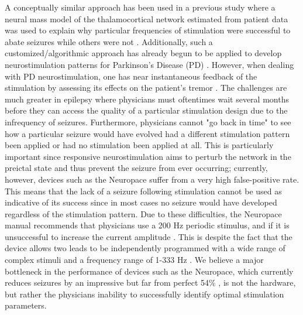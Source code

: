 \documentclass[11pt,a4paper,final]{article}
\begin{document}
A conceptually similar approach has been used in a previous study where a neural mass model of the thalamocortical network estimated from patient data was used to explain why particular frequencies of stimulation were successful to abate seizures while others were not \citep{wendling13}.
Additionally, such a customized/algorithmic approach has already begun to be applied to develop neurostimulation patterns for Parkinson's Disease (PD) \citep{holt14,grill14patent,brocker17,pena17}.
However, when dealing with PD neurostimulation, one has near instantaneous feedback of the stimulation by assessing its effects on the patient's tremor \citep{grill13}.
The challenges are much greater in epilepsy where physicians must oftentimes wait several months before they can access the quality of a particular stimulation design due to the infrequency of seizures.
Furthermore, physicians cannot "go back in time" to see how a particular seizure would have evolved had a different stimulation pattern been applied or had no stimulation been applied at all.
This is particularly important since responsive neurostimulation aims to perturb the network in the preictal state and thus prevent the seizure from ever occurring; currently, however, devices such as the Neuropace suffer from a very high false-positive rate.
This means that the lack of a seizure following stimulation cannot be used as indicative of its success since in most cases no seizure would have developed regardless of the stimulation pattern.
Due to these difficulties, the Neuropace manual recommends that physicians use a 200 Hz periodic stimulus, and if it is unsuccessful to increase the current amplitude \citep{NP}.
This is despite the fact that the device allows two leads to be independently programmed with a wide range of complex stimuli and a frequency range of 1-333 Hz \citep{sun08}.
We believe a major bottleneck in the performance of devices such as the Neuropace, which currently reduces seizures by an impressive but far from perfect 54\% \citep{heck14}, is not the hardware, but rather the physicians inability to successfully identify optimal stimulation parameters.
\end{document}
